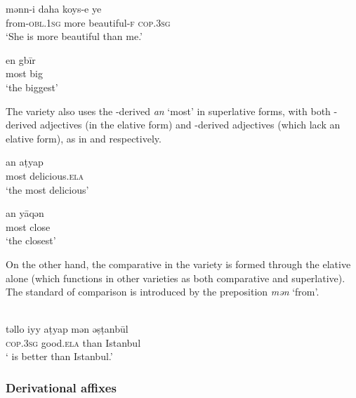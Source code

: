 \documentclass[output=paper]{langsci/langscibook}
\begin{document}
\ea \label{adj}  
		\ea \label{adj1}\gll mənn-i daha koys-e ye\\
   from-\textsc{obl.1sg} more beautiful-\textsc{f} \textsc{cop.3sg} \\
        \glt `She is more beautiful than me.'


	\ex \label{adj2} \gll en gbīr  \\
        most big\\
        \glt `the biggest'
\z
\z

\noindent The  variety also uses the -derived \textit{an} `most' in {superlative} forms, with both -derived adjectives (in the {elative} form) and -derived adjectives (which lack an {elative} form), as in  and  respectively.

\ea \label{adjt}
		\ea \label{adjt1}\gll an\footnotemark	 {} aṭyap\\
    most	delicious.\textsc{ela} \\
        \glt `the most delicious'


	\ex \label{adjt2} \gll an 	yāqən  \\
        most	close\\
        \glt `the closest'
\z
\z
{}

\noindent  On the other hand, the {comparative} in the  variety is formed through the {elative} alone (which functions in other  varieties as both {comparative} and {superlative}). The standard of comparison is introduced by the {preposition} \textit{mən} `from'.

\ea\label{adjt3} \\
\gll təllo 	iyy 		aṭyap mən 	ə\d{s}ṭanbūl\\
     	\textsc{cop.3sg}	good.\textsc{ela}	than	Istanbul \\
\glt ` is better than Istanbul.'
\z



\subsubsection{Derivational affixes}
\end{document}
